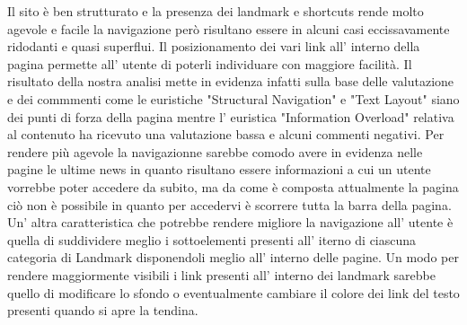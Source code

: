 Il sito è ben strutturato e la presenza dei landmark e shortcuts rende molto
agevole e facile la navigazione però risultano essere in alcuni casi
eccissavamente ridodanti e quasi superflui. Il posizionamento dei vari link all'
interno della pagina permette all' utente di poterli individuare con maggiore
facilità. Il risultato della nostra analisi mette in evidenza infatti sulla base
delle valutazione e dei commmenti come le euristiche "Structural Navigation" e
"Text Layout" siano dei punti di forza della pagina mentre l' euristica
"Information Overload" relativa al contenuto ha ricevuto una valutazione bassa e
alcuni commenti negativi. Per rendere più agevole la navigazionne sarebbe comodo
avere in evidenza nelle pagine le ultime news in quanto risultano essere
informazioni a cui un utente vorrebbe poter accedere da subito, ma da come è
composta attualmente la pagina ciò non è possibile in quanto per accedervi  è
scorrere tutta la barra della pagina. Un' altra caratteristica che potrebbe
rendere migliore la navigazione all' utente è quella di suddividere meglio i
sottoelementi presenti all' iterno di ciascuna categoria di Landmark
disponendoli meglio all' interno delle pagine. Un modo per rendere maggiormente
visibili i link presenti all' interno dei landmark sarebbe quello di modificare
lo sfondo o eventualmente cambiare il colore dei link del testo presenti quando
si apre la tendina.